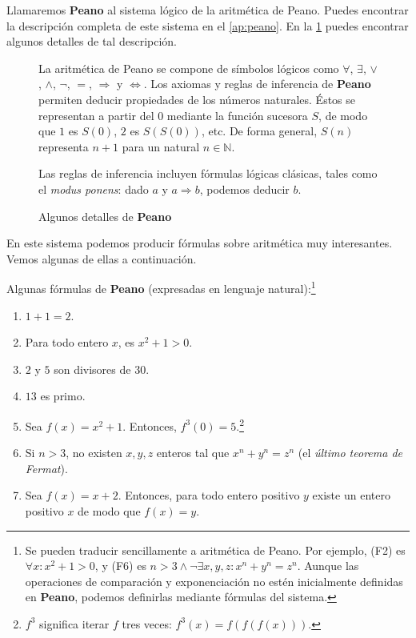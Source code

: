 Llamaremos \textbf{Peano} al sistema lógico de la aritmética de Peano. Puedes encontrar la descripción completa de este sistema en el \cref{ap:peano}. En la \cref{fig:peano} puedes encontrar algunos detalles de tal descripción.
\vspace{8pt}
\begin{figure}[H]
\begin{framed}
La aritmética de Peano se compone de símbolos lógicos como $\forall$, $\exists$, $\vee$, $\wedge$, $\neg$, $=$, $\Rightarrow$ y $\iff$. Los axiomas y reglas de inferencia de \textbf{Peano} permiten deducir propiedades de los números naturales. Éstos se representan a partir del $0$ mediante la función sucesora $S$, de modo que $1$ es $S(0)$, $2$ es $S(S(0))$, etc. De forma general, $S(n)$ representa $n+1$ para un natural $n\in\mathbb{N}$.

Las reglas de inferencia incluyen fórmulas lógicas clásicas, tales como el \emph{modus ponens}: dado $a$ y $a\Rightarrow b$, podemos deducir $b$.
\end{framed}
\caption{Algunos detalles de \textbf{Peano}}
\label{fig:peano}
\end{figure}
En este sistema podemos producir fórmulas sobre aritmética muy interesantes. Vemos algunas de ellas a continuación.
\begin{ejemplo}\label{ej:formulas-peano}
Algunas fórmulas de \textbf{Peano} (expresadas en lenguaje natural):\footnote{Se pueden traducir sencillamente a aritmética de Peano. Por ejemplo, (F2) es $\forall x : x^2+1>0$, y (F6) es \linebreak $n>3 \wedge \neg \exists x,y,z : x^n+y^n=z^n$. Aunque las operaciones de comparación y exponenciación no estén inicialmente definidas en \textbf{Peano}, podemos definirlas mediante fórmulas del sistema.}
\begin{enumerate}[label=(PF\arabic*),wide = 0pt,widest={10}, leftmargin =*]
    \item $1+1=2$.
    \item Para todo entero $x$, es $x^2 + 1 > 0$.
    \item $2$ y $5$ son divisores de $30$.
    \item $13$ es primo.
    \item Sea $f(x)=x^2+1$. Entonces, $f^3(0)=5$.\footnote{$f^3$ significa iterar $f$ tres veces: $f^3(x)=f(f(f(x)))$.}
    \item Si $n>3$, no existen $x,y,z$ enteros tal que $x^n+y^n=z^n$ (el \emph{último teorema de Fermat}).
    \item Sea $f(x)=x+2$. Entonces, para todo entero positivo $y$ existe un entero positivo $x$ de modo que $f(x)=y$.
\end{enumerate}
\end{ejemplo}


